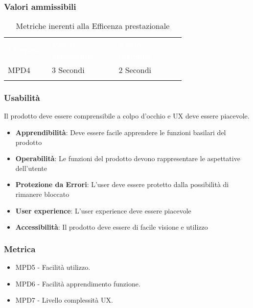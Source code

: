 \subsubsection{Valori ammissibili}
\renewcommand{\arraystretch}{1.5}
\begin{longtable}{p{0.12\linewidth}p{0.30\linewidth}p{0.30\linewidth}}
	\rowcolor[RGB]{33, 73, 50}
	\textcolor{white}{\textbf{Metrica}} & \textcolor{white}{\textbf{Valore accettabile}} & \textcolor{white}{\textbf{Valore ottimale}}\\
    \rowcolor[RGB]{233, 245, 206}
    MPD4 & 3 Secondi & 2 Secondi\\ 
    \caption{Metriche inerenti alla Efficenza prestazionale}
\end{longtable}	
\subsubsection{Usabilità}
Il prodotto deve essere comprensibile a colpo d'occhio e UX deve essere piacevole.
\begin{itemize}
    \item \textbf{Apprendibilità}: Deve essere facile apprendere le funzioni basilari del prodotto
    \item \textbf{Operabilità}: Le funzioni del prodotto devono rappresentare le aspettative dell'utente
    \item \textbf{Protezione da Errori}: L'user deve essere protetto dalla possibilità di rimanere bloccato
    \item \textbf{User experience}: L'user experience deve essere piacevole
    \item \textbf{Accessibilità}: Il prodotto deve essere di facile visione e utilizzo
\end{itemize}  
\subsubsection{Metrica}
\begin{itemize}
    \item MPD5 - Facilità utilizzo.
    \item MPD6 - Facilità apprendimento funzione.
    \item MPD7 - Livello complessità UX. %
\end{itemize}
